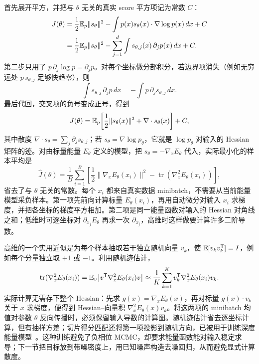 首先展开平方，并把与 \(\theta\) 无关的真实 score 平方项记为常数 \(C\)：
\begin{align}
 J(\theta)&=\frac12\mathbb{E}_p\|s_\theta\|^2-\int p(x)s_\theta(x)\cdot\nabla\log p(x)\,dx+C\\
 &=\frac12\mathbb{E}_p\|s_\theta\|^2-\sum_{j=1}^{d}\int s_{\theta,j}(x)\,\partial_jp(x)\,dx+C.
\end{align}
第二步只用了 \(p\,\partial_j\log p=\partial_jp\)。对每个坐标做分部积分，若边界项消失（例如无穷远处 \(p\,s_{\theta,j}\) 足够快趋零），则
\begin{equation}
 \int s_{\theta,j}\,\partial_jp\,dx
 =-\int p\,\partial_js_{\theta,j}\,dx.
\end{equation}
最后代回，交叉项的负号变成正号，得到
\begin{equation}
 J(\theta)=\mathbb{E}_p\!\left[\frac12\|s_\theta(x)\|^2+\nabla\cdot s_\theta(x)\right]+C,
 \label{eq:score-matching-computable}
\end{equation}
其中散度 \(\nabla\cdot s_\theta=\sum_j\partial_js_{\theta,j}\)；若 \(s_\theta=\nabla\log p_\theta\)，它就是 \(\log p_\theta\) 对输入的 Hessian 矩阵的迹。对由标量能量 \(E_\theta\) 定义的模型，把 \(s_\theta=-\nabla_xE_\theta\) 代入，实际最小化的样本平均是
\begin{equation}
 \widehat J(\theta)=\frac1B\sum_{i=1}^{B}\left[\frac12\|\nabla_xE_\theta(x_i)\|^2-\operatorname{tr}\!\left(\nabla_x^2E_\theta(x_i)\right)\right],
 \label{eq:ebm-score-matching-batch}
\end{equation}
省去了与 \(\theta\) 无关的常数。每个 \(x_i\) 都来自真实数据 minibatch，不需要从当前能量模型采负样本。第一项先前向计算标量 \(E_\theta(x_i)\)，再用自动微分对输入 \(x_i\) 求梯度，并把各坐标的梯度平方相加。第二项是同一能量函数对输入的 Hessian 对角线之和；低维时可逐坐标对 \(\partial_{x_j}E_\theta\) 再求一次 \(\partial_{x_j}\)，高维时这样做要计算许多二阶导数。

高维的一个实用近似是为每个样本抽取若干独立随机向量 \(v_k\)，使 \(\mathbb{E}[v_kv_k^\mathsf T]=I\)，例如每个分量独立取 \(+1\) 或 \(-1\)。利用随机迹估计，
\begin{equation}
 \operatorname{tr}(\nabla_x^2E_\theta(x_i))
 =\mathbb{E}_v\!\left[v^\mathsf T\nabla_x^2E_\theta(x_i)v\right]
 \approx\frac1K\sum_{k=1}^{K}v_k^\mathsf T\nabla_x^2E_\theta(x_i)v_k.
\end{equation}
实际计算无需存下整个 Hessian：先求 \(g(x)=\nabla_xE_\theta(x)\)，再对标量 \(g(x)\cdot v_k\) 关于 \(x\) 求梯度，便得到 Hessian--向量积 \(\nabla_x^2E_\theta(x)v_k\)。将这两项的 minibatch 均值对参数 \(\theta\) 反向传播时，必须保留输入导数的计算图。随机迹估计省去逐坐标计算，但有抽样方差；切片得分匹配还将第一项投影到随机方向，已被用于训练深度能量模型~\cite{song2020sliced}。这种训练避免了负相位 MCMC，却要求能量函数能对输入稳定求导；下一节把目标放到带噪密度上，用已知噪声构造去噪回归，从而避免显式计算散度。

